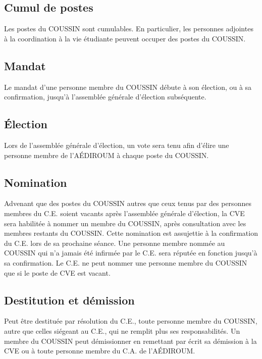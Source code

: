 \documentclass{aediroum}
\begin{document}
\subsection{Cumul de postes}\label{sec:cumul}

Les postes du COUSSIN sont cumulables.
En particulier, les personnes adjointes à la coordination à la vie étudiante peuvent occuper des postes du COUSSIN.

\subsection{Mandat}\label{sec:mandat-coussin}

Le mandat d'une personne membre du COUSSIN débute à son élection, ou à sa confirmation, jusqu'à l'assemblée générale d'élection subséquente.

\subsection{Élection}\label{sec:election-coussin}

Lors de l'assemblée générale d'élection, un vote sera tenu afin d'élire une personne membre de l'AÉDIROUM à chaque poste du COUSSIN.

\subsection{Nomination}\label{sec:nomination-coussin}

Advenant que des postes du COUSSIN autres que ceux tenus par des personnes membres du C.E. soient vacants après l'assemblée générale d'élection, la CVE sera habilitée à nommer un membre du COUSSIN, après consultation avec les membres restants du COUSSIN.
Cette nomination est assujettie à la confirmation du C.E. lors de sa prochaine séance.
Une personne membre nommée au COUSSIN qui n'a jamais été infirmée par le C.E. sera réputée en fonction jusqu'à sa confirmation.
Le C.E. ne peut nommer une personne membre du COUSSIN que si le poste de CVE est vacant.

\subsection{Destitution et démission}\label{sec:destitution-coussin}

Peut être destituée par résolution du C.E., toute personne membre du COUSSIN, autre que celles siégeant au C.E., qui ne remplit plus ses responsabilités.
Un membre du COUSSIN peut démissionner en remettant par écrit sa démission à la CVE ou à toute personne membre du C.A. de l'AÉDIROUM.
\end{document}
